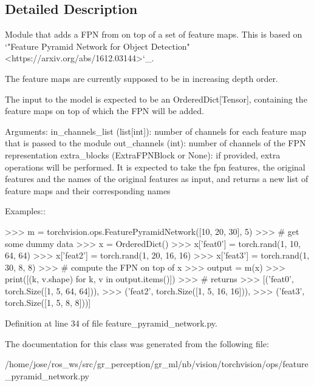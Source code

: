 \subsection{Detailed Description}
\begin{DoxyVerb}Module that adds a FPN from on top of a set of feature maps. This is based on
`"Feature Pyramid Network for Object Detection" <https://arxiv.org/abs/1612.03144>`_.

The feature maps are currently supposed to be in increasing depth
order.

The input to the model is expected to be an OrderedDict[Tensor], containing
the feature maps on top of which the FPN will be added.

Arguments:
    in_channels_list (list[int]): number of channels for each feature map that
        is passed to the module
    out_channels (int): number of channels of the FPN representation
    extra_blocks (ExtraFPNBlock or None): if provided, extra operations will
        be performed. It is expected to take the fpn features, the original
        features and the names of the original features as input, and returns
        a new list of feature maps and their corresponding names

Examples::

    >>> m = torchvision.ops.FeaturePyramidNetwork([10, 20, 30], 5)
    >>> # get some dummy data
    >>> x = OrderedDict()
    >>> x['feat0'] = torch.rand(1, 10, 64, 64)
    >>> x['feat2'] = torch.rand(1, 20, 16, 16)
    >>> x['feat3'] = torch.rand(1, 30, 8, 8)
    >>> # compute the FPN on top of x
    >>> output = m(x)
    >>> print([(k, v.shape) for k, v in output.items()])
    >>> # returns
    >>>   [('feat0', torch.Size([1, 5, 64, 64])),
    >>>    ('feat2', torch.Size([1, 5, 16, 16])),
    >>>    ('feat3', torch.Size([1, 5, 8, 8]))]\end{DoxyVerb}
 

Definition at line 34 of file feature\+\_\+pyramid\+\_\+network.\+py.



The documentation for this class was generated from the following file\+:\begin{DoxyCompactItemize}
\item 
/home/jose/ros\+\_\+ws/src/gr\+\_\+perception/gr\+\_\+ml/nb/vision/torchvision/ops/feature\+\_\+pyramid\+\_\+network.\+py\end{DoxyCompactItemize}
